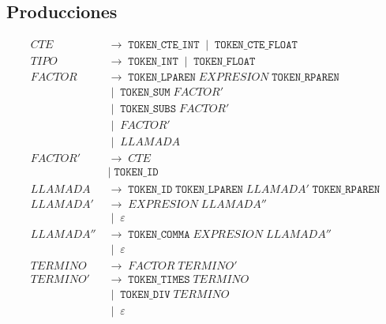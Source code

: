 \documentclass[12pt, letterpaper]{article}
\theoremstyle{definition}
\newcommand{\produce}{\;\longrightarrow\;}
\newcommand{\OR}{\;\mid\;}
\begin{document}
\subsection{Producciones}


{\small
\begin{align}
    \mathit{CTE} &\produce \texttt{TOKEN\_CTE\_INT} \OR \texttt{TOKEN\_CTE\_FLOAT} \label{p:cte} \\[3pt]
    \mathit{TIPO} &\produce \texttt{TOKEN\_INT} \OR \texttt{TOKEN\_FLOAT} \label{p:tipo} \\[3pt]
    \mathit{FACTOR} &\produce \texttt{TOKEN\_LPAREN}\;\mathit{EXPRESION}\;\texttt{TOKEN\_RPAREN} \\        
    & \OR \texttt{TOKEN\_SUM}\; \mathit{FACTOR'} \nonumber \\
    & \OR \texttt{TOKEN\_SUBS}\;  \mathit{FACTOR'} \nonumber \\
    & \OR \mathit{FACTOR'} \nonumber \\           
    & \OR \mathit{LLAMADA} \nonumber \label{p:factor}  \\[3pt]   
    \mathit{FACTOR'} & \produce  \mathit{CTE}  \\
                    & \OR \texttt{TOKEN\_ID} \nonumber \\[3pt]  
    \mathit{LLAMADA} &\produce \texttt{TOKEN\_ID}\;\texttt{TOKEN\_LPAREN}\;%
                       \mathit{LLAMADA'}\;\texttt{TOKEN\_RPAREN} \\[3pt]
    \mathit{LLAMADA'} &\produce  \mathit{EXPRESION}\; \mathit{LLAMADA''} \\                     
                      & \OR \varepsilon \nonumber \\[3pt]      
    \mathit{LLAMADA''} &\produce  \texttt{TOKEN\_COMMA} \; \mathit{EXPRESION}  \; \mathit{LLAMADA''}   \\                     
                      & \OR  \varepsilon \; \;  \nonumber\\[3pt]                                           
    \mathit{TERMINO} &\produce \mathit{FACTOR} \;  \mathit{TERMINO'}\;  \\[3pt]
    \mathit{TERMINO'} & \produce \texttt{TOKEN\_TIMES} \; \mathit{TERMINO}\\
                    & \OR \texttt{TOKEN\_DIV} \; \mathit{TERMINO}  \nonumber \\ 
                    & \OR \varepsilon  \nonumber \\[3pt]

\end{align}}
\end{document}
